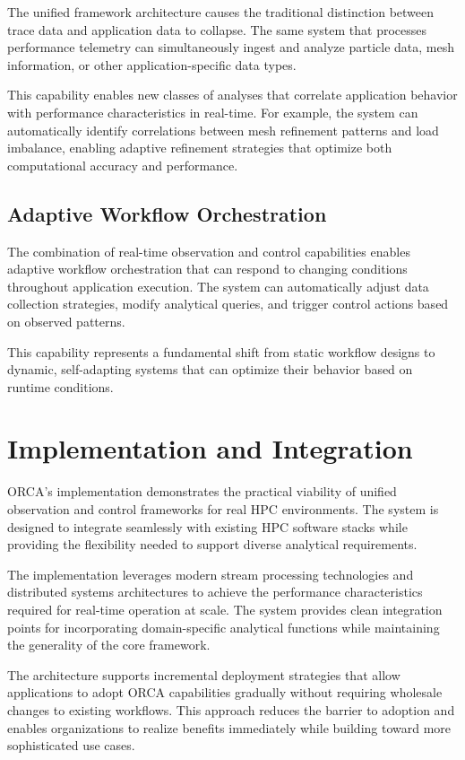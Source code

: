 The unified framework architecture causes the traditional distinction between trace data and
application data to collapse.
The same system that processes performance telemetry can simultaneously ingest and analyze
particle data, mesh information, or other application-specific data types.

This capability enables new classes of analyses that correlate application behavior with
performance characteristics in real-time.
For example, the system can automatically identify correlations between mesh refinement patterns
and load imbalance, enabling adaptive refinement strategies that optimize both computational
accuracy and performance.

\subsection{Adaptive Workflow Orchestration}

The combination of real-time observation and control capabilities enables adaptive workflow
orchestration that can respond to changing conditions throughout application execution.
The system can automatically adjust data collection strategies, modify analytical queries, and
trigger control actions based on observed patterns.

This capability represents a fundamental shift from static workflow designs to dynamic,
self-adapting systems that can optimize their behavior based on runtime conditions.

\section{Implementation and Integration}

ORCA's implementation demonstrates the practical viability of unified observation and control
frameworks for real HPC environments.
The system is designed to integrate seamlessly with existing HPC software stacks while providing
the flexibility needed to support diverse analytical requirements.

The implementation leverages modern stream processing technologies and distributed systems
architectures to achieve the performance characteristics required for real-time operation at
scale.
The system provides clean integration points for incorporating domain-specific analytical
functions while maintaining the generality of the core framework.

The architecture supports incremental deployment strategies that allow applications to adopt
ORCA capabilities gradually without requiring wholesale changes to existing workflows.
This approach reduces the barrier to adoption and enables organizations to realize benefits
immediately while building toward more sophisticated use cases.

